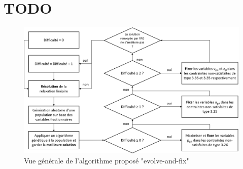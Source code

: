 \section{TODO}

\begin{figure}[h!]
    \begin{center}
        \includegraphics[width=\textwidth]{imgs/evolveandfix.png}\\
        Vue générale de l'algorithme proposé "evolve-and-fix"
    \end{center}
\end{figure}